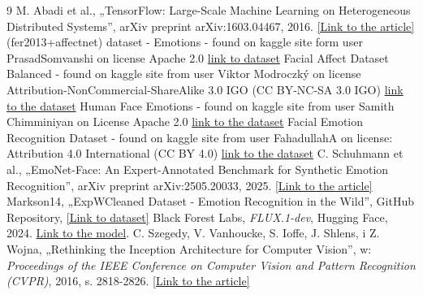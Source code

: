 \documentclass{article}
\begin{document}
\begin{thebibliography}{9}
    M. Abadi et al., „TensorFlow: Large-Scale Machine Learning on Heterogeneous Distributed Systems”, arXiv preprint arXiv:1603.04467, 2016. \href{https://www.tensorflow.org/}{[Link to the article]} 
    (fer2013+affectnet) dataset - Emotions - found on kaggle site form user PrasadSomvanshi on license Apache 2.0 \href{https://www.kaggle.com/datasets/prasadsomvanshih/fer2013-affectnet-dataset-emotions/data?fbclid=IwY2xjawQOZipleHRuA2FlbQIxMQBzcnRjBmFwcF9pZAEwAAEeeakwhP0rBKTNC9dH0_7OUlwZgdrUVN_qAnQQVBijJ42LuroL_KM-VX6xPaM_aem_M1YE76_0EMbx7yb1aUcGzQ}{link to dataset}
    Facial Affect Dataset Balanced - found on kaggle site from user Viktor Modroczký on license Attribution-NonCommercial-ShareAlike 3.0 IGO (CC BY-NC-SA 3.0 IGO) \href{https://www.kaggle.com/datasets/viktormodroczky/facial-affect-dataset}{link to the dataset}
    Human Face Emotions - found on kaggle site from user Samith Chimminiyan on License Apache 2.0 \href{https://www.kaggle.com/datasets/samithsachidanandan/human-face-emotions?fbclid=IwY2xjawQRS4pleHRuA2FlbQIxMQBzcnRjBmFwcF9pZAEwAAEeFoE2tKxAJHbQbfM4sPKdUYLckVtJX8uKNkO-qEWGZ1SNsIFSDW6J9IakJq8_aem_CrDZH0whQgTOAbaWuiPq2w}{link to the dataset}
    Facial Emotion Recognition Dataset - found on kaggle site from user FahadullahA on license: Attribution 4.0 International (CC BY 4.0) \href{https://www.kaggle.com/datasets/fahadullaha/facial-emotion-recognition-dataset?fbclid=IwY2xjawQRS4xleHRuA2FlbQIxMQBzcnRjBmFwcF9pZAEwAAEeNf73G1bYjDj_hAsEGtd7YcKzrPsfmEE5SWb8qHwRVCud6sVvNcniatFb4Ac_aem_A_MxoTH_SaY2XDt-hgU_7Q}{link to the dataset}
    C. Schuhmann et al., „EmoNet-Face: An Expert-Annotated Benchmark for Synthetic Emotion Recognition”, arXiv preprint arXiv:2505.20033, 2025. \href{https://arxiv.org/abs/2505.20033}{[Link to the article]}
    Markson14, „ExpWCleaned Dataset - Emotion Recognition in the Wild”, GitHub Repository, \href{https://github.com/markson14/ExpWCleaned}{[Link to dataset]} 
    Black Forest Labs, \textit{FLUX.1-dev}, Hugging Face, 2024. 
    \href{https://huggingface.co/black-forest-labs/FLUX.1-dev}{Link to the model}.
    C. Szegedy, V. Vanhoucke, S. Ioffe, J. Shlens, i Z. Wojna, „Rethinking the Inception Architecture for Computer Vision”, w: \textit{Proceedings of the IEEE Conference on Computer Vision and Pattern Recognition (CVPR)}, 2016, s. 2818-2826. \href{https://arxiv.org/abs/1512.00567}{[Link to the article]}
    

\end{thebibliography}
\end{document}
